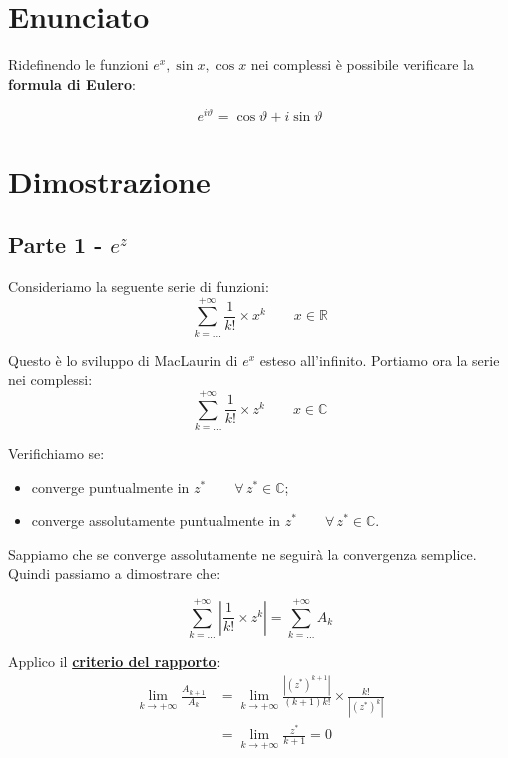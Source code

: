 \documentclass[../../analisi1]{subfiles}
\begin{document}
        \section*{Enunciato}

            Ridefinendo le funzioni \( e^x, \sin x, \cos x \) nei complessi è possibile verificare la \textbf{formula di Eulero}:

                \[  e^{i\vartheta} = \cos \vartheta + i \sin \vartheta \]

        \section*{Dimostrazione}

            \subsection*{Parte 1 - \(e^z\)}    

                Consideriamo la seguente serie di funzioni:
                \[  \sum_{k=\dots}^{+\infty} \frac{1}{k!} \times x^k \qquad x \in \mathbb{R}  \]

                Questo è lo sviluppo di MacLaurin di \(e^x\) esteso all'infinito. Portiamo ora la serie nei complessi:
                \[  \sum_{k=\dots}^{+\infty} \frac{1}{k!} \times z^k \qquad x \in \mathbb{C}  \]

                Verifichiamo se:
                \begin{itemize}
                    \item converge puntualmente in \(z^* \qquad \forall \, z^*  \in \mathbb{C}\);
                    \item converge assolutamente puntualmente in \(z^* \qquad \forall \, z^*  \in \mathbb{C}\).
                \end{itemize}
            
                Sappiamo che se converge assolutamente ne seguirà la convergenza semplice. Quindi passiamo a dimostrare che:

                \[  \sum_{k=\dots}^{+\infty} \left| \frac{1}{k!} \times z^k \right| = \sum_{k=\dots}^{+\infty} A_k \]

                Applico il \textbf{\hyperref[criterioRapportoSerie]{criterio del rapporto}}:
                \begin{align*}
                    \lim_{k \to +\infty} \frac{A_{k+1}}{A_k} &= \lim_{k \to +\infty} \frac{\left|(z^*)^{k+1}\right|}{(k+1)k!} \times \frac{k!}{\left|(z^*)^k\right|} \\
                    &= \lim_{k \to +\infty} \frac{z^*}{k+1} = 0
                \end{align*}
\end{document}
